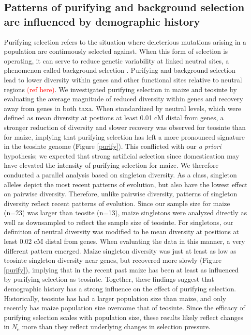 \documentclass{pnastwo}
\begin{document}
\begin{article}
\subsection{Patterns of purifying and background selection are
  influenced by demographic history}
Purifying selection refers to the situation where deleterious
mutations arising in a population are continuously selected against. When this
form of selection is operating, it can serve to reduce genetic
variability at linked neutral sites, a phenomenon called
background selection \cite{charlesworth1993}. Purifying and background selection lead
to lower diversity within genes and other functional sites relative
to neutral regions \textcolor{red}{(ref here)}. We investigated purifying
selection in maize and teosinte by evaluating the average magnitude of reduced
diversity within genes and recovery away from genes in both taxa. When standardized by neutral
levels, which were defined as mean diversity at postions at least 0.01 cM distal
from genes, a stronger reduction of diversity
and slower recovery was observed for teosinte than for maize, implying
that purifying selection has left a more pronounced signature in the
teosinte genome (Figure \ref{purify}). This conflicted with our \emph{a priori} hypothesis;
we expected that strong artificial selection since domestication may
have elevated the intensity of purifying selection for maize. We therefore
conducted a parallel analysis based on singleton diversity. As a class,
singleton alleles depict the most recent patterns of evolution, but
also have the lowest effect on pairwise diversity. Therefore, unlike
pairwise diversity, patterns of singleton
diversity reflect recent patterns of evolution. Since our sample size
for maize (n=23) was larger than teosite (n=13), maize singletons were
analyzed directly as well as downsampled to reflect the sample size of
teosinte. For singletons, our definition of
neutral diversity was modified to be mean diversity at positions at
least 0.02 cM distal from genes. When
evaluating the data in this manner, a very different pattern
emerged. Maize singleton diversity was just at least as low as teosinte singleton
diversity near genes, but recovered more slowly
(Figure \ref{purify}), implying that in the
recent past maize has been at least as influenced by purifying selection as
teosinte. Together, these findings suggest that demographic history has
a strong influence on the effect of purifying selection. Historically,
teosinte has had a larger population size than maize, and only
recently has maize population size overcome that of teosinte. Since
the efficacy of purifying selection scales with population size,
these results likely reflect changes in $N_e$ more than they reflect
underlying changes in selection pressure.



\end{article}
\end{document}
